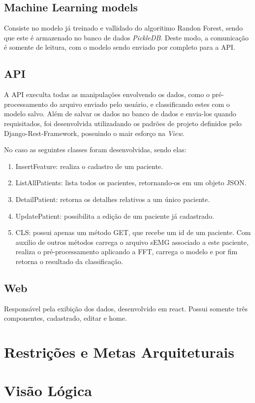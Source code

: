 \begin{anexosenv}
	\subsection{Machine Learning models}
	Consiste no modelo já treinado e vallidado do algoritimo Randon Forest, sendo que este é armazenado no banco de dados \textit{PickleDB}. Deste modo, a comunicação é somente de leitura, com o modelo sendo enviado por completo para a API.
	\subsection{API}
	A API execulta todas as manipulações envolvendo os dados, como o pré-processamento do arquivo enviado pelo usuário, e classificando estes com o modelo salvo. Além de salvar os dados no banco de dados e envia-los quando requisitados, foi desenvolvida utilizadando os padrões de projeto definidos pelo Django-Rest-Framework, possuindo o mair esforço na \textit{View}.

	No caso as seguintes classes foram desenvolvidas, sendo elas:
	\begin{enumerate}
		\item InsertFeature: realiza o cadastro de um paciente.
		\item ListAllPatients: lista todos os pacientes, retornando-os em um objeto JSON.
		\item DetailPatient: retorna os detalhes relativos a um único paciente.
		\item UpdatePatient: possibilita a edição de um paciente já cadastrado.
		\item CLS: possui apenas um método GET, que recebe um id de um paciente. Com auxilio de outros métodos carrega o arquivo sEMG associado a este paciente, realiza o pré-processamento aplicando a FFT, carrega o modelo e por fim retorna o resultado da classificação.
	\end{enumerate}
	
	\subsection{Web}
	Responsável pela exibição dos dados, desenvolvido em react. Possui somente três componentes, cadastrado, editar e home.

	\section{Restrições e Metas Arquiteturais}
	\section{Visão Lógica}

\end{anexosenv}

